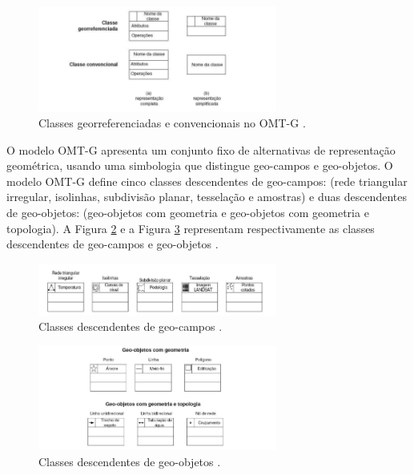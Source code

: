 \begin{figure}[h]
\centering
\includegraphics[width=0.70\textwidth]{./img/cap_II/7-ClassesOMTG}
\caption{Classes georreferenciadas e convencionais no OMT-G \cite{omtg}.}
\label{fig:ClassesOMTG}
\end{figure}

O modelo OMT-G apresenta um conjunto fixo de alternativas de representação geométrica, usando uma simbologia que distingue geo-campos e geo-objetos. O modelo OMT-G define cinco classes descendentes de geo-campos: (rede triangular irregular, isolinhas, subdivisão planar, tesselação e amostras) e duas descendentes de geo-objetos: (geo-objetos com geometria e geo-objetos com geometria e topologia). A Figura \ref{fig:ClassesGeo-campos} e a Figura \ref{fig:ClassesGeo-objetos} representam respectivamente as classes descendentes de geo-campos e geo-objetos \cite{omtg}.

\newpage

\begin{figure}[h]
\centering
\includegraphics[width=0.70\textwidth]{./img/cap_II/8-ClassesGeo-campos}
\caption{Classes descendentes de geo-campos \cite{omtg}.}
\label{fig:ClassesGeo-campos}
\end{figure}

\begin{figure}[h]
\centering
\includegraphics[width=0.70\textwidth]{./img/cap_II/9-ClassesGeo-objetos}
\caption{Classes descendentes de geo-objetos \cite{omtg}.}
\label{fig:ClassesGeo-objetos}
\end{figure}

